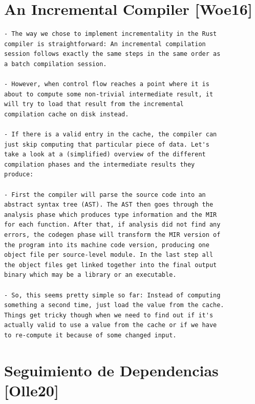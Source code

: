 \documentclass[12pt, a4paper]{report}
\begin{document}
\section*{An Incremental Compiler [Woe16]}

\begin{verbatim}
- The way we chose to implement incrementality in the Rust
compiler is straightforward: An incremental compilation
session follows exactly the same steps in the same order as
a batch compilation session.

- However, when control flow reaches a point where it is
about to compute some non-trivial intermediate result, it
will try to load that result from the incremental
compilation cache on disk instead.

- If there is a valid entry in the cache, the compiler can
just skip computing that particular piece of data. Let's
take a look at a (simplified) overview of the different
compilation phases and the intermediate results they
produce:

- First the compiler will parse the source code into an
abstract syntax tree (AST). The AST then goes through the
analysis phase which produces type information and the MIR
for each function. After that, if analysis did not find any
errors, the codegen phase will transform the MIR version of
the program into its machine code version, producing one
object file per source-level module. In the last step all
the object files get linked together into the final output
binary which may be a library or an executable.

- So, this seems pretty simple so far: Instead of computing
something a second time, just load the value from the cache.
Things get tricky though when we need to find out if it's
actually valid to use a value from the cache or if we have
to re-compute it because of some changed input.
\end{verbatim}
\cite{rust_blog_incremental_compilation}

\section*{Seguimiento de Dependencias [Olle20]}
\end{document}
